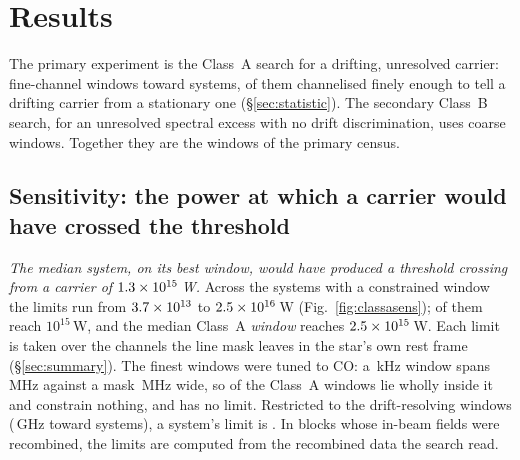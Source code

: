 \section{Results}
\label{sec:results}

The primary experiment is the Class~A search for a drifting, unresolved
carrier: \NWinA{} fine-channel windows toward \NSysClassA{} systems,
\EdrNWinA{} of them channelised finely enough to tell a drifting carrier from
a stationary one (\S\ref{sec:statistic}). The secondary Class~B search, for an
unresolved spectral excess with no drift discrimination, uses \NWinB{} coarse
windows. Together they are the \NWindows{} windows of the primary census.

\subsection{Sensitivity: the power at which a carrier would have crossed
the threshold} \label{sec:pninetysel}

\emph{The median system, on its best window, would have produced a threshold
crossing from a carrier of $1.3\times10^{15}$\,W.} Across the \NSysALim{}
systems with a constrained window the limits run from $3.7\times10^{13}$ to
$2.5\times10^{16}$\,W (Fig.~\ref{fig:classasens}); \NSysEfifteen{} of them
reach $10^{15}$\,W, and the median Class~A \emph{window} reaches
$2.5\times10^{15}$\,W. Each limit is taken over the channels the line mask
leaves in the star's own rest frame (\S\ref{sec:summary}). The finest windows
were tuned to CO: a \UmFineChanKHz\,kHz window spans \UmFineBwMHz\,MHz against
a mask \UmFineMaskMHz\,MHz wide, so \UmNWinAFull{} of the \NWinA{} Class~A
windows lie wholly inside it and constrain nothing, and \NSysALostName{} has no
limit. Restricted to the \EdrNWinA{} drift-resolving windows
(\EdrUnionGHz\,GHz toward \EdrNSys{} systems), a system's limit is
\ScEdrMedClause. In
\FcNBlock{} blocks whose in-beam fields were recombined, the limits are
computed from the recombined data the search read.

